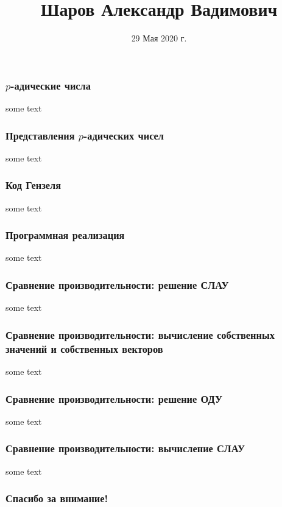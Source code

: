 \documentclass[10pt,professionalfont,utf8,presentation,compress]{beamer}
\title[Приложение $p$-адической арифметики к задачам компьютерной алгебры}
\author[Шаров Александр Вадимович]{Шаров Александр Вадимович}
\institute[<<Информатика и вычислительная техника>>]{<<Информатика и вычислительная техника>>}
\date{29 Мая 2020 г.}
\begin{document}
\frame[plain]{\titlepage}



\begin{frame}
\frametitle{$p$-адические числа}
	some text
\end{frame}


\begin{frame}
\frametitle{Представления $p$-адических чисел}
	some text
\end{frame}

\begin{frame}
\frametitle{Код Гензеля}
	some text
\end{frame}


\begin{frame}
\frametitle{Программная реализация}
	some text
\end{frame}

\begin{frame}
\frametitle{Сравнение производительности: решение СЛАУ}
	some text
\end{frame}

\begin{frame}
\frametitle{Сравнение производительности: вычисление собственных значений и собственных векторов}
	some text
\end{frame}

\begin{frame}
\frametitle{Сравнение производительности: решение ОДУ}
	some text
\end{frame}

\begin{frame}
\frametitle{Сравнение производительности: вычисление СЛАУ}
	some text
\end{frame}


\begin{frame}[c]
\begin{center}
\frametitle{\LARGE Спасибо за внимание!}

{\LARGE \inserttitle}

\bigskip\bigskip

{\large \insertauthor}

\bigskip\bigskip

{\insertinstitute}

\bigskip\bigskip

{\large \insertdate}
\end{center}
\end{frame}
\end{document}
